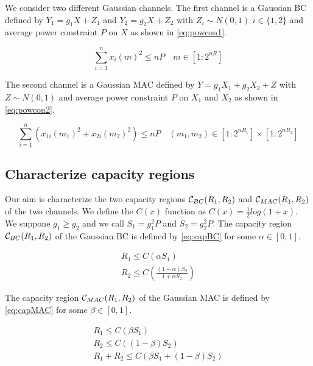 
We consider two different Gaussian channels. The first channel is a Gaussian BC defined by $Y_1 = g_1 X + Z_1$  and $Y_2 = g_2 X + Z_2$ with $Z_i \sim N(0,1)$ $i \in \{1,2\}$ and average power constraint $P$ on $X$ as shown in \eqref{eq:powcon1}.

\begin{equation}
	\sum_{i=1}^n x_i(m)^2 \leq nP \quad m \in [1:2^{nR}]
	\label{eq:powcon1}
\end{equation}

The second channel is a Gaussian MAC defined by $Y = g_1 X_1 + g_2 X_2 + Z$ with $Z \sim N(0,1)$ and average power constraint $P$ on $X_1$ and $X_2$ as shown in \eqref{eq:powcon2}.

\begin{equation}
	\sum_{i=1}^n \left( x_{1i}(m_1)^2 + x_{2i}(m_2)^2 \right) \leq nP \quad (m_1,m_2) \in [1:2^{nR_1}] \times [1:2^{nR_2}]
	\label{eq:powcon2}
\end{equation}

\subsection{Characterize capacity regions}

Our aim is characterize the two capacity regions $\mathcal{C}_{BC}(R_1, R_2)$ and $\mathcal{C}_{MAC}(R_1, R_2)$ of the two channels. We define the $C(x)$ function as $C(x)=\frac{1}{2}log(1+x)$. We suppone $g_1 \geq g_2$ and we call $S_1=g_1^2P$ and $S_2=g_2^2P$. The capacity region $\mathcal{C}_{BC}(R_1, R_2)$ of the Gaussian BC is defined by \eqref{eq:capBC} for some $\alpha \in [0,1]$.

\begin{equation}
	\begin{gathered}
		R_1 \leq C(\alpha S_1) \\
		R_2 \leq C\left(\frac{(1-\alpha)S_2}{1+\alpha S_2}\right)
	\end{gathered}
	\label{eq:capBC}
\end{equation}

The capacity region $\mathcal{C}_{MAC}(R_1, R_2)$ of the Gaussian MAC is defined by \eqref{eq:capMAC} for some $\beta \in [0,1]$.

\begin{equation}
	\begin{gathered}
		R_1 \leq C(\beta S_1) \\
		R_2 \leq C((1-\beta) S_2) \\
		R_1 + R_2 \leq C(\beta S_1 + (1-\beta)S_2)
	\end{gathered}
	\label{eq:capMAC}
\end{equation}


